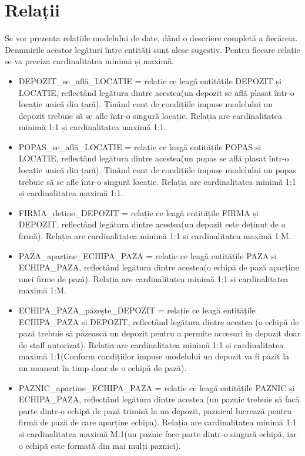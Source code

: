 \documentclass[12pt, a4paper]{article}
\begin{document}
\section{Relații}
\quad\newline
Se vor prezenta relațiile modelului de date, dând o descriere completă a fiecăreia. Denumirile acestor legături între entități sunt alese sugestiv. Pentru fiecare relație se va preciza cardinalitatea minimă și maximă.
\begin{itemize}
    \item DEPOZIT\_se\_află\_LOCATIE = relație ce leagă entitățile DEPOZIT și LOCATIE, reflectând legătura dintre acestea(un depozit se află plasat într-o locație unică din țară). Ținând cont de condițiile impuse modelului un depozit trebuie să se afle într-o singură locație. Relația are cardinalitatea minimă 1:1 și cardinalitatea maximă 1:1.
    \item POPAS\_se\_află\_LOCATIE = relație ce leagă entitățile POPAS și  LOCATIE, reflectând legătura dintre acestea(un popas se află plasat într-o locație unică din țară). Ținând cont de condițiile impuse modelului un popas trebuie să se afle într-o singură locație. Relația are cardinalitatea minimă 1:1 și cardinalitatea maximă 1:1.
    \item FIRMA\_detine\_DEPOZIT = relație ce leagă entitățile FIRMA și DEPOZIT, reflectând legătura dintre acestea(un depozit este deținut de o firmă). Relația are cardinalitatea minimă 1:1 si cardinalitatea maximă 1:M.
    \item PAZA\_aparține\_ECHIPA\_PAZA = relație ce leagă entitățile PAZA și ECHIPA\_PAZA, reflectând legătura dintre acestea(o echipă de pază aparține unei firme de pază). Relația are cardinalitatea minimă 1:1 si cardinalitatea maximă 1:M.
    \item ECHIPA\_PAZA\_păzește\_DEPOZIT = relație ce leagă entitățile \\ECHIPA\_PAZA și DEPOZIT, reflectând legătura dintre acestea (o echipă de pază trebuie să păzească un depozit pentru a permite accesuri în depozit doar de staff autorizat). Relația are cardinalitatea minimă 1:1 si cardinalitatea maximă 1:1(Conform condițiilor impuse modelului un depozit va fi păzit la un moment în timp doar de o echipă de pază).
    \item PAZNIC\_aparține\_ECHIPA\_PAZA = relație ce leagă entitățile PAZNIC și ECHIPA\_PAZA, reflectând legătura dintre acestea (un paznic trebuie să facă parte dintr-o echipă de pază trimisă la un depozit, paznicul lucrează pentru firmă de pază de care aparține echipa). Relația are cardinalitatea minimă 1:1 si cardinalitatea maximă M:1(un paznic face parte dintr-o singură echipă, iar o echipă este formată din mai mulți paznici).

\end{itemize}
\end{document}
